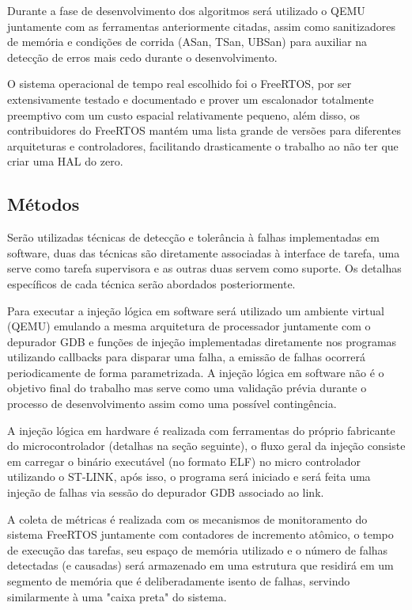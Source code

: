 
Durante a fase de desenvolvimento dos algoritmos será utilizado o QEMU juntamente com as ferramentas anteriormente citadas, assim como sanitizadores de memória e condições de corrida (ASan, TSan, UBSan) para auxiliar na detecção de erros mais cedo durante o desenvolvimento.

O sistema operacional de tempo real escolhido foi o FreeRTOS, por ser extensivamente testado e documentado e prover um escalonador totalmente preemptivo com um custo espacial relativamente pequeno, além disso, os contribuidores do FreeRTOS mantém uma lista grande de versões para diferentes arquiteturas e controladores, facilitando drasticamente o trabalho ao não ter que criar uma HAL do zero.

\subsection{Métodos}

Serão utilizadas técnicas de detecção e tolerância à falhas implementadas em software, duas das técnicas são diretamente associadas à interface de tarefa, uma serve como tarefa supervisora e as outras duas servem como suporte. Os detalhas específicos de cada técnica serão abordados posteriormente.

Para executar a injeção lógica em software será utilizado um ambiente virtual (QEMU) emulando a mesma arquitetura de processador juntamente com o depurador GDB e funções de injeção implementadas diretamente nos programas utilizando callbacks para disparar uma falha, a emissão de falhas ocorrerá periodicamente de forma parametrizada. A injeção lógica em software não é o objetivo final do trabalho mas serve como uma validação prévia durante o processo de desenvolvimento assim como uma possível contingência.

A injeção lógica em hardware é realizada com ferramentas do próprio fabricante do microcontrolador (detalhas na seção seguinte), o fluxo geral da injeção consiste em carregar o binário executável (no formato ELF) no micro controlador utilizando o ST-LINK, após isso, o programa será iniciado e será feita uma injeção de falhas via sessão do depurador GDB associado ao link.

A coleta de métricas é realizada com os mecanismos de monitoramento do sistema FreeRTOS juntamente com contadores de incremento atômico, o tempo de execução das tarefas, seu espaço de memória utilizado e o número de falhas detectadas (e causadas) será armazenado em uma estrutura que residirá em um segmento de memória que é deliberadamente isento de falhas, servindo similarmente à uma "caixa preta" do sistema.

